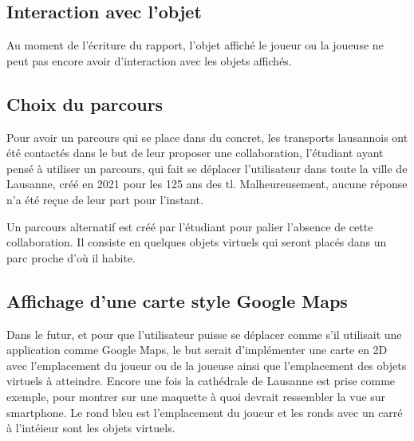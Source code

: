 \subsection{Interaction avec l'objet}
Au moment de l'écriture du rapport, l'objet affiché le joueur ou la joueuse ne peut pas encore avoir d'interaction avec les objets affichés.
\subsection{Choix du parcours}
Pour avoir un parcours qui se place dans du concret, les transports lausannois
ont été contactés dans le but de leur proposer une collaboration, l'étudiant ayant pensé à
utiliser un parcours, qui fait se déplacer l'utilisateur dans toute la ville de Lausanne,
créé en 2021 pour les 125 ans des tl.\cite{hatetVeriteLionsLausannois2021} Malheureusement, aucune réponse n'a été reçue de leur
part pour l'instant.

Un parcours alternatif est créé par l'étudiant pour palier l'absence de
cette collaboration. Il consiste en quelques objets virtuels qui seront placés dans un parc proche d'où il habite.

\subsection{Affichage d'une carte style Google Maps}
Dans le futur, et pour que l'utilisateur puisse se déplacer comme s'il utilisait une application comme
Google Maps, le but serait d'implémenter une carte en 2D avec l'emplacement du joueur ou de la joueuse ainsi que l'emplacement
des objets virtuels à atteindre. Encore une fois la cathédrale de Lausanne est prise comme exemple, pour montrer sur une maquette à quoi
devrait ressembler la vue sur smartphone. Le rond bleu est l'emplacement du joueur et les ronds avec un carré à l'intéieur sont les objets
virtuels.

